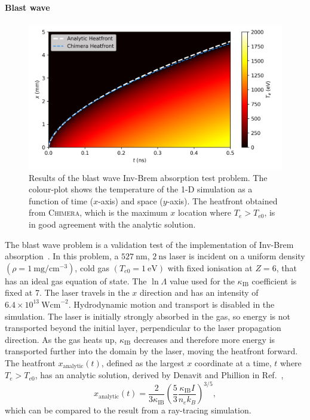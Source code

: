 \paragraph*{Blast wave}

\begin{figure}[t!]
    \includegraphics[width=0.9\linewidth]{Numerics/Images/blastwave.png}
    \centering
    \caption{Results of the blast wave \ac{Inv-Brem} absorption test problem.
    The colour-plot shows the temperature of the 1-D simulation as a function of time ($x$-axis) and space ($y$-axis).
    The heatfront obtained from \textsc{Chimera}, which is the maximum $x$ location where $T_e>T_{e0}$, is in good agreement with the analytic solution.}%
    \label{fig:SOLAS_blastwave}
\end{figure}

The blast wave problem is a validation test of the implementation of \ac{Inv-Brem} absorption~\cite{denavit_laser_1994,haines_coupling_2020}.
In this problem, a $527\ \text{nm}$, $2\ \text{ns}$ laser is incident on a uniform density $(\rho = 1\ \text{mg}/\text{cm}^{-3})$, cold gas $(T_{e0} = 1\ \text{eV})$ with fixed ionisation at $Z=6$, that has an ideal gas equation of state.
The $\ln{\Lambda}$ value used for the $\kappa_{\text{IB}}$ coefficient is fixed at 7.
The laser travels in the $x$ direction and has an intensity of $6.4\times 10^{13}\ \text{Wcm}^{-2}$.
Hydrodynamic motion and transport is disabled in the simulation.
The laser is initially strongly absorbed in the gas, so energy is not transported beyond the initial layer, perpendicular to the laser propagation direction.
As the gas heats up, $\kappa_{\text{IB}}$ decreases and therefore more energy is transported further into the domain by the laser, moving the heatfront forward.
The heatfront $x_{\text{analytic}}(t)$, defined as the largest $x$ coordinate at a time, $t$ where $T_e>T_{e0}$, has an analytic solution, derived by Denavit and Phillion in Ref.~\cite{denavit_laser_1994},
\begin{equation}
    x_{\text{analytic}}(t) = \frac{2}{3\kappa_{\text{IB}}}\left( \frac{5}{3} \frac{\kappa_{\text{IB}}I}{n_e k_B} \right)^{3/5},
\end{equation}
which can be compared to the result from a ray-tracing simulation.

